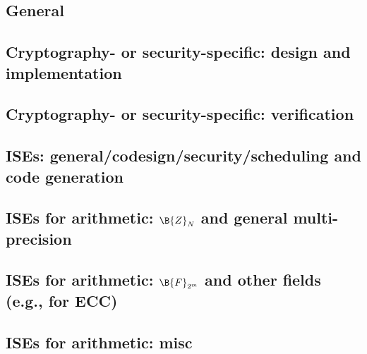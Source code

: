 
\subsection*{General}
\cite{SCARV:Gutmann:00}
\cite{SCARV:WuWeaAus:01}
\cite{SCARV:MTRGS:99}
\cite{SCARV:GGHJPTW:11}
\cite{SCARV:CosLebDev:16}

\subsection*{Cryptography- or security-specific: design and implementation}
\cite{SCARV:FouMoo:05,SCARV:Fournier:07,SCARV:KocSavGro:08,SCARV:TheSisPne:09,SCARV:TilKirSze:10,SCARV:NREAMM:12,SCARV:YumSav:15,SCARV:RagAmbPar:15,SCARV:AweAus:17,SCARV:YHEF:18,SCARV:WJWDGSN:18,SCARV:ZHCPH:18}

\subsection*{Cryptography- or security-specific: verification}
\cite{SCARV:KZDN:18}

\subsection*{ISEs: general/codesign/security/scheduling and code generation}
\cite{SCARV:Fiskiran:05}
\cite{SCARV:BarGioMar:09}
\cite{SCARV:RegIen:16}
\cite{SCARV:FazLopOli:18}
\cite{SCARV:KLWGSTW:06,SCARV:GIPTV:06}
\cite{SCARV:RCSBKBLI:09}
\cite{SCARV:ManGre:10,SCARV:ManMagGre:10,SCARV:Manley:11}

\subsection*{ISEs for arithmetic: $\B{Z}_{N}$ and general multi-precision}
\cite{SCARV:Gro:02,SCARV:Gro:03,SCARV:GroKam:03:a,SCARV:GAST:05,SCARV:GroTilSze:07}
\subsection*{ISEs for arithmetic: $\B{F}_{2^m}$ and other fields (e.g., for ECC)}
\cite{SCARV:GroKam:03:b,SCARV:FisLee:04,SCARV:GroKumPaa:04,SCARV:KumPaa:04,SCARV:BBGM:08}
\subsection*{ISEs for arithmetic: misc}
\cite{SCARV:GroKam:03,SCARV:GroSav:04,SCARV:VejPagGro:07}

